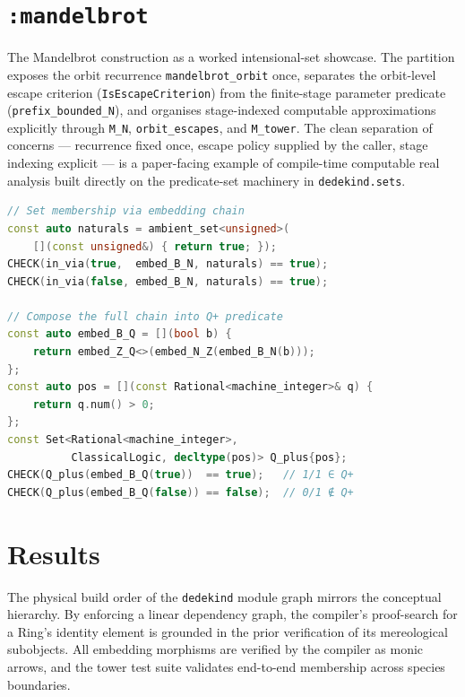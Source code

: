 \documentclass[11pt, a4paper]{report}
\begin{document}
\section{\texttt{:mandelbrot}}
\label{sec:numbers-mandelbrot}

The Mandelbrot construction as a worked intensional-set showcase. The partition exposes the orbit recurrence \texttt{mandelbrot\_orbit} once, separates the orbit-level escape criterion (\texttt{IsEscapeCriterion}) from the finite-stage parameter predicate (\texttt{prefix\_bounded\_N}), and organises stage-indexed computable approximations explicitly through \texttt{M\_N}, \texttt{orbit\_escapes}, and \texttt{M\_tower}. The clean separation of concerns --- recurrence fixed once, escape policy supplied by the caller, stage indexing explicit --- is a paper-facing example of compile-time computable real analysis built directly on the predicate-set machinery in \texttt{dedekind.sets}.

\begin{lstlisting}[language=C++, caption={Numbers: inter-species embedding $\mathbb{B} \hookrightarrow \mathbb{N} \hookrightarrow \mathbb{Z} \hookrightarrow \mathbb{Q}$ (from \texttt{tower\_test.cpp}).}, label={lst:numbers-tower}]
// Set membership via embedding chain
const auto naturals = ambient_set<unsigned>(
    [](const unsigned&) { return true; });
CHECK(in_via(true,  embed_B_N, naturals) == true);
CHECK(in_via(false, embed_B_N, naturals) == true);

// Compose the full chain into Q+ predicate
const auto embed_B_Q = [](bool b) {
    return embed_Z_Q<>(embed_N_Z(embed_B_N(b)));
};
const auto pos = [](const Rational<machine_integer>& q) {
    return q.num() > 0;
};
const Set<Rational<machine_integer>,
          ClassicalLogic, decltype(pos)> Q_plus{pos};
CHECK(Q_plus(embed_B_Q(true))  == true);   // 1/1 ∈ Q+
CHECK(Q_plus(embed_B_Q(false)) == false);  // 0/1 ∉ Q+
\end{lstlisting}

\section{Results}

The physical build order of the \texttt{dedekind} module graph mirrors the conceptual hierarchy.
By enforcing a linear dependency graph, the compiler's proof-search for a Ring's identity element is grounded in the prior verification of its mereological subobjects.
All embedding morphisms are verified by the compiler as monic arrows, and the tower test suite validates end-to-end membership across species boundaries.
\end{document}
